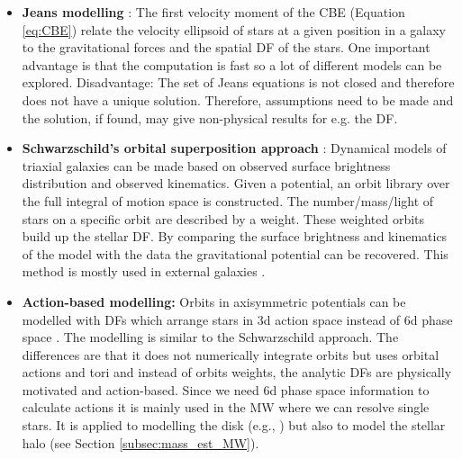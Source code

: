 \begin{itemize}
    \item \textbf{Jeans modelling} \citep{Jeans.....1915}: The first velocity moment of the \ac{CBE} (Equation \ref{eq:CBE}) relate the velocity ellipsoid of stars at a given position in a galaxy to the gravitational forces and the spatial \ac{DF} of the stars. One important advantage is that the computation is fast so a lot of different models can be explored. Disadvantage: The set of Jeans equations is not closed and therefore does not have a unique solution. Therefore, assumptions need to be made and the solution, if found, may give non-physical results for e.g. the \ac{DF}. 
    \item \textbf{Schwarzschild's orbital superposition approach} \citep{Schwarzschild...1979}: Dynamical models of triaxial galaxies can be made based on observed surface brightness distribution and observed kinematics. Given a potential, an orbit library over the full integral of motion space is constructed. The number/mass/light of stars on a specific orbit are described by a weight. These weighted orbits build up the stellar \ac{DF}. By comparing the surface brightness and kinematics of the model with the data the gravitational potential can be recovered. This method is mostly used in external galaxies \citep{Rix...Schwarzschild...1997, vdBosch...Schwarzschild...2008, Vasiliev...Schwarzschild...2013, Ling...Schwarzschild...2018}.
    \item \textbf{Action-based modelling:} Orbits in axisymmetric potentials can be modelled with \acp{DF} which arrange stars in 3d action space instead of 6d phase space \citep{Binney...actionbasedmodelling...2012, Bovy...actionbasedmodelling...2013}. The modelling is similar to the Schwarzschild approach. The differences are that it does not numerically integrate orbits but uses orbital actions and tori and instead of orbits weights, the analytic \acp{DF} are physically motivated and action-based. Since we need 6d phase space information to calculate actions it is mainly used in the \ac{MW} where we can resolve single stars. It is applied to modelling the disk (e.g., \citealt{trick...ROADMAPPING...2016, Wilmathesis}) but also to model the stellar halo (see Section \ref{subsec:mass_est_MW}). 
\end{itemize}
